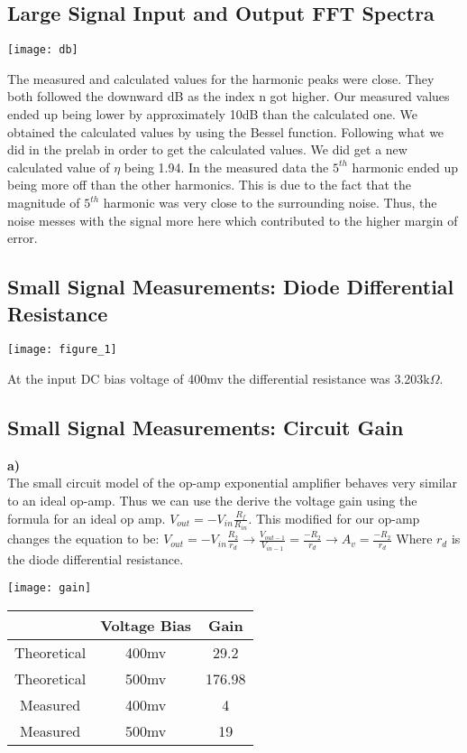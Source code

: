 \documentclass[12pt, oneside]{article}
\begin{document}
\subsection{Large Signal Input and Output FFT Spectra}
\begin{center}
\texttt{[image: db]}
\end{center}
The measured and calculated values for the harmonic peaks were close. They both followed the downward dB as the index n got higher. Our measured values ended up being lower by approximately 10dB than the calculated one. We obtained the calculated values by using the Bessel function. Following what we did in the prelab in order to get the calculated values. We did get a new calculated value of $\eta$ being 1.94. In the measured data the $5^{th}$ harmonic ended up being more off than the other harmonics. This is due to the fact that the magnitude of $5^{th}$ harmonic was very close to the surrounding noise. Thus, the noise messes with the signal more here which contributed to the higher margin of error.


\subsection{Small Signal Measurements: Diode Differential Resistance}
\begin{center}
\texttt{[image: figure\_1]}
\end{center}
At the input DC bias voltage of 400mv the differential resistance was 3.203k$\Omega$.

\subsection{Small Signal Measurements: Circuit Gain}
\textbf{a)}\\
The small circuit model of the op-amp exponential amplifier behaves very similar to an ideal op-amp. Thus we can use the derive the voltage gain using the formula for an ideal op amp. $V_{out}=-V_{in}\frac{R_f}{R_{in}}$. This modified for our op-amp changes the equation to be: $V_{out}=-V_{in}\frac{R_2}{r_{d}} \rightarrow \frac{V_{out-1}}{V_{in-1}}=\frac{-R_2}{r_d}\rightarrow A_v=\frac{-R_2}{r_d}$ Where $r_d$ is the diode differential resistance.\\
\begin{center}
\texttt{[image: gain]}
\end{center}

\begin{center}
 \begin{tabular}{||c | c | c||} 
 \hline
   & Voltage Bias & Gain\\ 
 \hline
 Theoretical & 400mv & 29.2\\
 \hline
  Theoretical & 500mv & 176.98\\

 \hline
 Measured & 400mv & 4\\
 \hline
  Measured & 500mv & 19\\
 
 \hline
\end{tabular}
\end{center}
\end{document}
